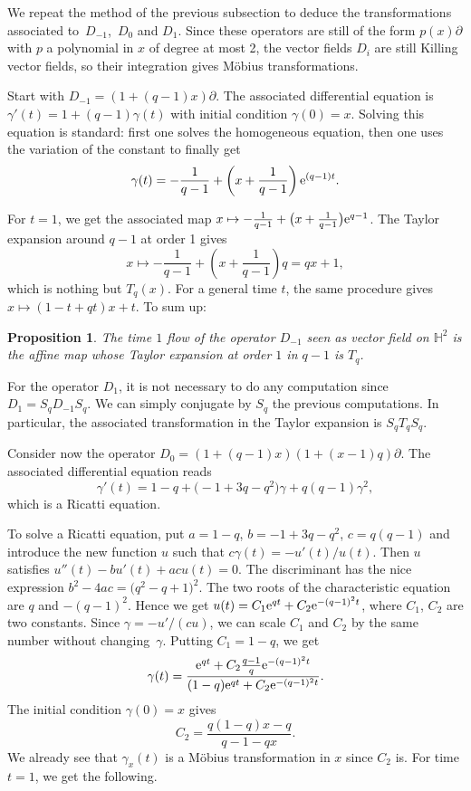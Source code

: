 \documentclass[10pt,a4paper]{amsart}
\numberwithin{equation}{section}
\newtheorem{Proposition}[Theorem]{Proposition}
 { \theoremstyle{definition}
\newtheorem{Definition}[Theorem]{Definition}
\newtheorem{Note}[Theorem]{Note}
\newtheorem{Example}[Theorem]{Example}
\newtheorem{Remark}[Theorem]{Remark} }
\renewcommand*{\H}{\mathbb{H}}
\begin{document}
We repeat the method of the previous subsection to deduce the transformations associated to~$D_{-1}$,~$D_0$ and $D_1$. Since these operators are still of the form $p(x)\partial$ with $p$ a polynomial in $x$ of degree at most 2, the vector fields $D_i$ are still Killing vector fields, so their integration gives M\"obius transformations.

Start with $D_{-1}\!=\!(1+(q-1)x)\partial$. The associated differential equation is ${\gamma'(t)=1+(q-1)\gamma(t)}$ with initial condition $\gamma(0)=x$. Solving this equation is standard: first one solves the homogeneous equation, then one uses the variation of the constant to finally get
\[
\gamma(t)=-\frac{1}{q-1}+\left(x+\frac{1}{q-1}\right){\rm e}^{(q-1)t}.
\]

For $t=1$, we get the associated map $x\mapsto -\tfrac{1}{q-1}+\big(x+\tfrac{1}{q-1}\big){\rm e}^{q-1}$. The Taylor expansion around $q-1$ at order 1 gives
\[
x\mapsto -\frac{1}{q-1}+\left(x+\frac{1}{q-1}\right)q = qx+1,
\]
which is nothing but $T_q(x)$.
For a general time $t$, the same procedure gives $x\mapsto (1-t+qt)x+t$. To sum up:
\begin{Proposition}
The time $1$ flow of the operator $D_{-1}$ seen as vector field on $\H^2$ is the affine map  whose Taylor expansion at order $1$ in $q-1$ is $T_q$.
\end{Proposition}

For the operator $D_1$, it is not necessary to do any computation since $D_1=S_qD_{-1}S_q$. We can simply conjugate by $S_q$ the previous computations. In particular, the associated transformation in the Taylor expansion is $S_qT_qS_q$.

Consider now the operator $D_0=(1+(q-1)x)(1+(x-1)q)\partial$. The associated differential equation reads
\[
\gamma'(t)=1-q+\bigl(-1+3q-q^2\bigr)\gamma+q(q-1)\gamma^2,
\]
which is a Ricatti equation.

To solve a Ricatti equation, put $a=1-q$, $b=-1+3q-q^2$, $c=q(q-1)$ and introduce the new function $u$ such that $c\gamma(t)=-u'(t)/u(t)$. Then $u$ satisfies $u''(t)-bu'(t)+acu(t) = 0$. The discriminant has the nice expression $b^2-4ac=\big(q^2-q+1\big)^2$. The two roots of the characteristic equation are $q$ and $-(q-1)^2$. Hence we get $u(t)=C_1 {\rm e}^{qt}+C_2 {\rm e}^{-(q-1)^2t}$,
where $C_1$, $C_2$ are two constants. Since $\gamma=-u'/(cu)$, we can scale $C_1$ and $C_2$ by the same number without changing~$\gamma$. Putting $C_1=1-q$, we get
\[
\gamma(t)=\frac{{\rm e}^{qt}+C_2 \frac{q-1}{q}{\rm e}^{-(q-1)^2t}}{(1-q){\rm e}^{qt}+C_2 {\rm e}^{-(q-1)^2t}}.
\]
The initial condition $\gamma(0)=x$ gives
\[
C_2=\frac{q(1-q)x-q}{q-1-qx}.
\]
We already see that $\gamma_x(t)$ is a M\"obius transformation in $x$ since $C_2$ is. For time $t=1$, we get the following.
\end{document}
